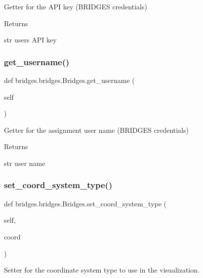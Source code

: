 Getter for the A\+PI key (B\+R\+I\+D\+G\+ES credentials) 

\begin{DoxyReturn}{Returns}


str user\textquotesingle{}s A\+PI key 
\end{DoxyReturn}
\mbox{\label{classbridges_1_1bridges_1_1_bridges_abf6fdb19db336c2ed14987fdd89d65fe}} 
\subsubsection{\texorpdfstring{get\_username()}{get\_username()}}
{\footnotesize\ttfamily def bridges.\+bridges.\+Bridges.\+get\+\_\+username (\begin{DoxyParamCaption}\item[{}]{self }\end{DoxyParamCaption})}



Getter for the assignment user name (B\+R\+I\+D\+G\+ES credentials) 

\begin{DoxyReturn}{Returns}


str user name 
\end{DoxyReturn}
\mbox{\label{classbridges_1_1bridges_1_1_bridges_a6bc905490b1995234f88f47af9aa8a17}} 
\subsubsection{\texorpdfstring{set\_coord\_system\_type()}{set\_coord\_system\_type()}}
{\footnotesize\ttfamily def bridges.\+bridges.\+Bridges.\+set\+\_\+coord\+\_\+system\+\_\+type (\begin{DoxyParamCaption}\item[{}]{self,  }\item[{}]{coord }\end{DoxyParamCaption})}



Setter for the coordinate system type to use in the visualization. 


